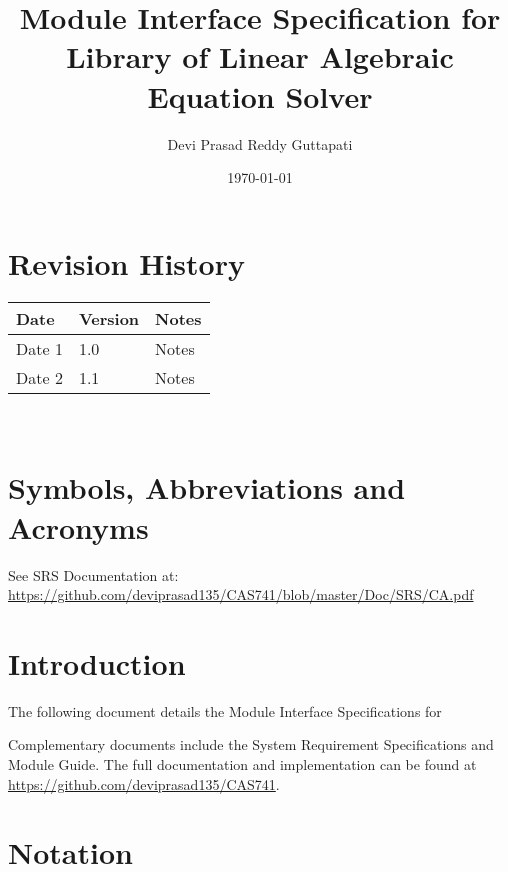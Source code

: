 \documentclass[12pt, titlepage]{article}
\begin{document}
\title{Module Interface Specification for Library of Linear Algebraic Equation Solver}

\author{Devi Prasad Reddy Guttapati}

\date{\today}

\maketitle


\section{Revision History}

\begin{tabularx}{\textwidth}{p{3cm}p{2cm}X}
\toprule {\bf Date} & {\bf Version} & {\bf Notes}\\
\midrule
Date 1 & 1.0 & Notes\\
Date 2 & 1.1 & Notes\\
\bottomrule
\end{tabularx}

~\newpage

\section{Symbols, Abbreviations and Acronyms}

See SRS Documentation at:  \url{https://github.com/deviprasad135/CAS741/blob/master/Doc/SRS/CA.pdf}


\newpage

\tableofcontents

\newpage


\section{Introduction}

The following document details the Module Interface Specifications for

Complementary documents include the System Requirement Specifications
and Module Guide.  The full documentation and implementation can be
found at \url{https://github.com/deviprasad135/CAS741}.  %

\section{Notation}
\end{document}

